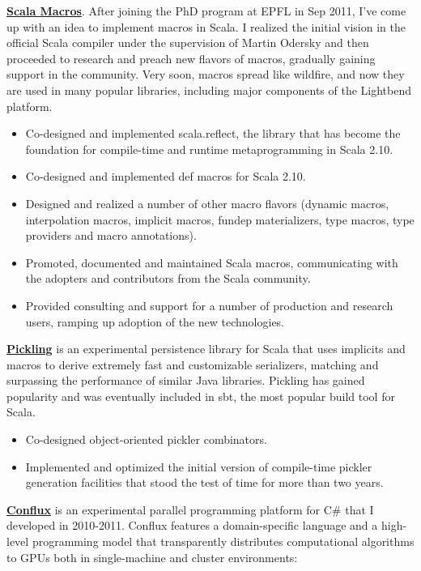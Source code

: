 \documentclass[margin, 10pt]{Stylesheet}
\begin{document}
\begin{resume}
\textbf{\href{http://scalamacros.org/}{Scala Macros}}. After joining the PhD program at EPFL in
Sep 2011, I've come up with an idea to implement macros in Scala. I realized the initial vision in
the official Scala compiler under the supervision of Martin Odersky and then proceeded to research
and preach new flavors of macros, gradually gaining support in the community. Very soon, macros
spread like wildfire, and now they are used in many popular libraries, including major components
of the Lightbend platform.

\begin{itemize} \itemsep -2pt
\item Co-designed and implemented scala.reflect, the library that has become the foundation for
compile-time and runtime metaprogramming in Scala 2.10.
\item Co-designed and implemented def macros for Scala 2.10.
\item Designed and realized a number of other macro flavors (dynamic macros, interpolation macros,
implicit macros, fundep materializers, type macros, type providers and macro annotations).
\item Promoted, documented and maintained Scala macros, communicating with the adopters
and contributors from the Scala community.
\item Provided consulting and support for a number of production and research users,
ramping up adoption of the new technologies.
\end{itemize}

\textbf{\href{https://github.com/scala/pickling}{Pickling}} is an experimental persistence library
for Scala that uses implicits and macros to derive extremely fast and customizable serializers,
matching and surpassing the performance of similar Java libraries. Pickling has gained popularity
and was eventually included in sbt, the most popular build tool for Scala.

\begin{itemize} \itemsep -2pt
\item Co-designed object-oriented pickler combinators.
\item Implemented and optimized the initial version of compile-time pickler generation facilities
that stood the test of time for more than two years.
\end{itemize}

\textbf{\href{http://code.google.com/p/conflux/}{Conflux}} is an experimental parallel programming
platform for C\# that I developed in 2010-2011. Conflux features a domain-specific language and
a high-level programming model that transparently distributes computational algorithms to GPUs both
in single-machine and cluster environments:


\end{resume}
\end{document}
